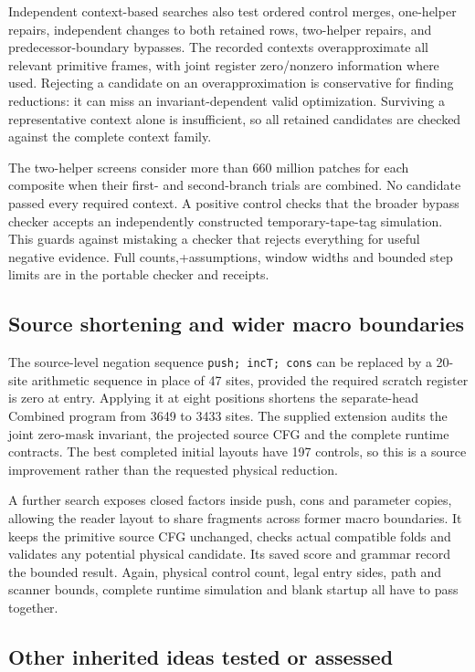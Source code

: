 \documentclass[11pt,a4paper]{article}
\newcommand{\file}[1]{\texttt{\nolinkurl{#1}}}
\begin{document}
Independent context-based searches also test ordered control merges,
one-helper repairs, independent changes to both retained rows,
two-helper repairs, and predecessor-boundary bypasses. The recorded
contexts overapproximate all relevant primitive frames, with joint
register zero/nonzero information where used. Rejecting a candidate
on an overapproximation is conservative for finding reductions: it
can miss an invariant-dependent valid optimization. Surviving a
representative context alone is insufficient, so all retained candidates
are checked against the complete context family.

The two-helper screens consider more than 660 million patches for each
composite when their first- and second-branch trials are combined.
No candidate passed every required context. A positive control checks
that the broader bypass checker accepts an independently constructed
temporary-tape-tag simulation. This guards against mistaking a checker
that rejects everything for useful negative evidence. Full counts,+assumptions, window widths and bounded step limits are in the portable
checker and receipts.

\subsection{Source shortening and wider macro boundaries}

The source-level negation sequence \file{push; incT; cons} can be
replaced by a 20-site arithmetic sequence in place of 47 sites, provided
the required scratch register is zero at entry. Applying it at eight
positions shortens the separate-head Combined program from 3649 to 3433
sites. The supplied extension audits the joint zero-mask invariant,
the projected source CFG and the complete runtime contracts. The best
completed initial layouts have 197 controls, so this is a source
improvement rather than the requested physical reduction.

A further search exposes closed factors inside push, cons and parameter
copies, allowing the reader layout to share fragments across former
macro boundaries. It keeps the primitive source CFG unchanged, checks
actual compatible folds and validates any potential physical candidate.
Its saved score and grammar record the bounded result. Again, physical
control count, legal entry sides, path and scanner bounds, complete
runtime simulation and blank startup all have to pass together.

\subsection{Other inherited ideas tested or assessed}
\end{document}
